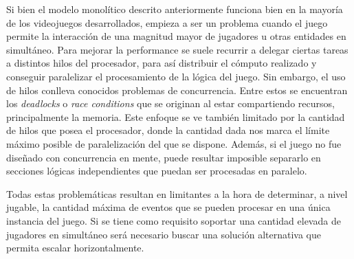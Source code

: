 
\noindent Si bien el modelo monolítico descrito anteriormente funciona bien en la mayoría de los 
videojuegos desarrollados, empieza a ser un problema cuando el juego 
permite la interacción de una magnitud mayor de jugadores u otras entidades en simultáneo. 
Para mejorar la performance se suele recurrir a delegar ciertas tareas a distintos hilos del procesador, para así distribuir 
el cómputo realizado y conseguir paralelizar el procesamiento de la lógica del juego. 
Sin embargo, el uso de hilos conlleva conocidos problemas de concurrencia. Entre estos se encuentran los \textit{deadlocks} o \textit{race conditions} que se originan al estar compartiendo 
recursos, principalmente la memoria. Este enfoque se ve también limitado por la cantidad de hilos 
que posea el procesador, donde la cantidad dada nos marca el límite máximo posible de paralelización
del que se dispone. Además, si el juego no fue diseñado con concurrencia en mente, puede resultar imposible separarlo en secciones lógicas
independientes que puedan ser procesadas en paralelo.

Todas estas problemáticas resultan en limitantes a la hora de determinar, a nivel jugable,
la cantidad máxima de eventos que se pueden procesar en una única instancia del juego.
Si se tiene como requisito soportar una cantidad elevada de jugadores
en simultáneo será necesario buscar una solución alternativa que permita escalar horizontalmente.
